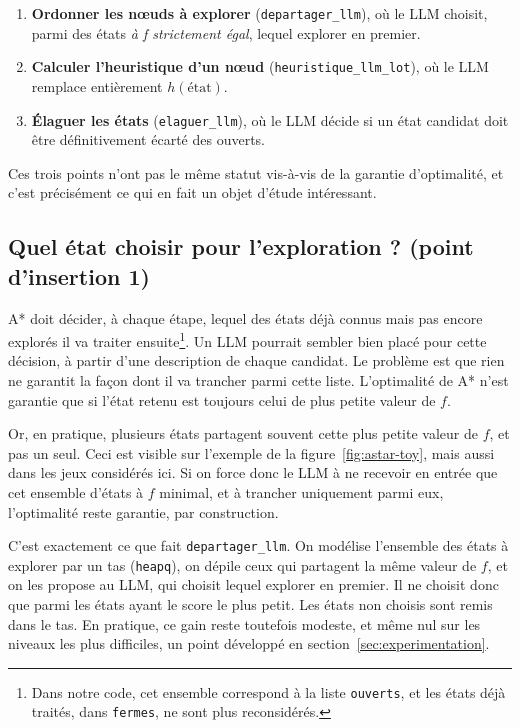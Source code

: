 \documentclass[11pt,a4paper]{article}
\begin{document}
\begin{enumerate}
    \item \textbf{Ordonner les nœuds à explorer} (\texttt{departager\_llm}), où le LLM choisit, parmi des états \emph{à f strictement égal}, lequel explorer en premier.
    \item \textbf{Calculer l'heuristique d'un nœud} (\texttt{heuristique\_llm\_lot}), où le LLM remplace entièrement $h(\text{état})$.
    \item \textbf{Élaguer les états} (\texttt{elaguer\_llm}), où le LLM décide si un état candidat doit être définitivement écarté des ouverts.
\end{enumerate}

Ces trois points n'ont pas le même statut vis-à-vis de la garantie d'optimalité, et c'est précisément ce qui en fait un objet d'étude intéressant.

\subsection{Quel état choisir pour l'exploration ? (point d'insertion 1)}

A* doit décider, à chaque étape, lequel des états déjà connus mais pas encore explorés il va traiter ensuite\footnote{Dans notre code, cet ensemble correspond à la liste \texttt{ouverts}, et les états déjà traités, dans \texttt{fermes}, ne sont plus reconsidérés.}. Un LLM pourrait sembler bien placé pour cette décision, à partir d'une description de chaque candidat. Le problème est que rien ne garantit la façon dont il va trancher parmi cette liste. L'optimalité de A* n'est garantie que si l'état retenu est toujours celui de plus petite valeur de $f$.

Or, en pratique, plusieurs états partagent souvent cette plus petite valeur de $f$, et pas un seul. Ceci est visible sur l'exemple de la figure~\ref{fig:astar-toy}, mais aussi dans les jeux considérés ici. Si on force donc le LLM à ne recevoir en entrée que cet ensemble d'états à $f$ minimal, et à trancher uniquement parmi eux, l'optimalité reste garantie, par construction.

C'est exactement ce que fait \texttt{departager\_llm}. On modélise l'ensemble des états à explorer par un tas (\texttt{heapq}), on dépile ceux qui partagent la même valeur de $f$, et on les propose au LLM, qui choisit lequel explorer en premier. Il ne choisit donc que parmi les états ayant le score le plus petit. Les états non choisis sont remis dans le tas. En pratique, ce gain reste toutefois modeste, et même nul sur les niveaux les plus difficiles, un point développé en section~\ref{sec:experimentation}.
\end{document}
